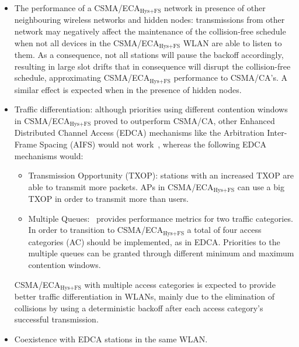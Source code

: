 \begin{itemize}
	\item The performance of a CSMA/ECA$_{\text{Hys+FS}}$ network in presence of other neighbouring wireless networks and hidden nodes: transmissions from other network may negatively affect the maintenance of the collision-free schedule when not all devices in the CSMA/ECA$_{\text{Hys+FS}}$ WLAN are able to listen to them. As a consequence, not all stations will pause the backoff accordingly, resulting in large slot drifts that in consequence will disrupt the collision-free schedule, approximating CSMA/ECA$_{\text{Hys+FS}}$ performance to CSMA/CA's. A similar effect is expected when in the presence of hidden nodes.
	\item Traffic differentiation: although priorities using different contention windows in CSMA/ECA$_{\text{Hys+FS}}$ proved to outperform CSMA/CA, other Enhanced Distributed Channel Access (EDCA) mechanisms like the Arbitration Inter-Frame Spacing (AIFS) would not work~\cite{jaumeTD}, whereas the following EDCA mechanisms would:
	\begin{itemize}
		\item Transmission Opportunity (TXOP): stations with an increased TXOP are able to transmit more packets. APs in CSMA/ECA$_{\text{Hys+FS}}$ can use a big TXOP in order to transmit more than users.
		\item Multiple Queues:~\cite{jaumeTD} provides performance metrics for two traffic categories. In order to transition to CSMA/ECA$_{\text{Hys+FS}}$ a total of four access categories (AC) should be implemented, as in EDCA. Priorities to the multiple queues can be granted through different minimum and maximum contention windows.
	\end{itemize}
	CSMA/ECA$_{\text{Hys+FS}}$ with multiple access categories is expected to provide better traffic differentiation in WLANs, mainly due to the elimination of collisions by using a deterministic backoff after each access category's successful transmission.
	\item Coexistence with EDCA stations in the same WLAN.
\end{itemize}